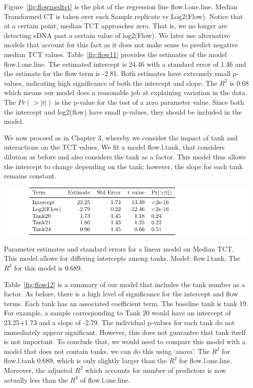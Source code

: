 Figure~\ref{fig:flowmedtct} is the plot of the regression line flow.l.one.line. Median Transformed CT is taken over each Sample.replicate vs Log2(Flow). Notice that at a certain point, median TCT approaches zero. That is, we no longer are detecting eDNA past a certain value of log2(Flow). We later use alternative models that account for this fact as it does not make sense to predict negative median TCT values. Table~\ref{fig:flow11} provides the estimates of the model flow.l.one.line. The estimated intercept is 24.46 with a standard error of 1.46 and the estimate for the flow term is -2.81. Both estimates have extremely small p-values, indicating high significance of both the intercept and slope. The $R^{2}$ is 0.68 which means our model does a reasonable job at explaining variation in the data. The $Pr(> |t|)$  is the p-value for the test of a zero parameter value. Since both the intercept and log2(flow) have small p-values, they should be included in the model.
 


\newpage

We now proceed as in Chapter 3, whereby we consider the impact of tank and interactions on the TCT values.  We fit a model flow.l.tank, that considers dilution as before and also considers the tank as a factor. This model thus allows the intercept to change depending on the tank; however, the slope for each tank remains constant. 

\vspace{5mm}


\begin{table}[H]
\includegraphics{Chapter4Images/flowltank.pdf}
\caption{Parameter estimates and standard errors for a linear model on Median TCT. This model allows for differing intercepts among tanks. Model: flow.l.tank.  The $R^{2}$ for this model is 0.689.}
\label{fig:flow12}
\end{table}

Table~\ref{fig:flow12} is a summary of our model that  includes the tank number as a factor.  As before, there is a high level of significance for the intercept and flow terms. Each tank has an associated coefficient term. The baseline tank is tank 19. For example, a sample corresponding to Tank 20 would have an intercept of 23.25+1.73 and a slope of -2.79. The individual p-values for each tank do not immediately appear significant. However, this does not guarantee that tank itself is not important. To conclude that, we would need to compare this model with a model that does not contain tanks, we can do this using `anova'.  The $R^{2}$ for flow.l.tank 0.689, which is only slightly larger than the $R^{2}$ for flow.l.one.line. Moreover, the adjusted $R^{2}$ which accounts for number of predictors is now actually less than the $R^{2}$ of flow.l.one.line.

